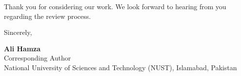\documentclass[11pt,a4paper]{article}
\begin{document}
\vspace{0.8em}

\noindent Thank you for considering our work. We look forward to hearing from you regarding the review process.

\vspace{1.2em}

\noindent Sincerely,

\vspace{0.8em}

\noindent \textbf{Ali Hamza} \\
Corresponding Author \\
National University of Sciences and Technology (NUST), Islamabad, Pakistan
\end{document}
